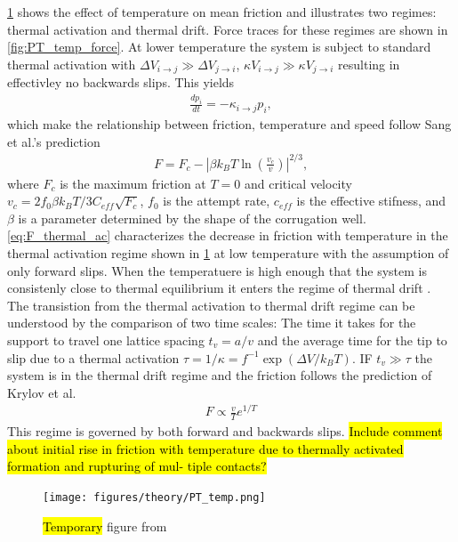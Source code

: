 \cref{fig:PT_temp} shows the effect of temperature on mean friction and illustrates two regimes: thermal activation and thermal drift. Force traces for these regimes are shown in \cref{fig:PT_temp_force}. At lower temperature the system is subject to standard thermal activation with $\Delta V_{i \to j} \gg \Delta V_{j \to i}$,   $\kappa V_{i \to j} \gg \kappa V_{j \to i}$ resulting in effectivley no backwards slips. This yields 
\begin{align*}
  \frac{dp_i}{dt} = -\kappa_{i\to j}p_i,
\end{align*}
which make the relationship between friction, temperature and speed follow Sang et al.’s prediction \cite{Sang_2001}
\begin{align}
  F=F_c-\left|\beta k_B T \ln \left(\frac{v_c}{v}\right)\right|^{2 / 3},
  \label{eq:F_thermal_ac}
\end{align}
where $F_c$ is the maximum friction at $T = 0$ and critical velocity $v_c = 2f_0
\beta k_B T / 3 C_{eff} \sqrt{F_c}$, $f_0$ is the attempt rate, $c_{eff}$ is the
effective stifness, and $\beta$ is a parameter determined by the shape of the
corrugation well. \cref{eq:F_thermal_ac} characterizes the decrease in friction
with temperature in the thermal activation regime shown in \cref{fig:PT_temp} at
low temperature with the assumption of only forward slips. When the temperatuere
is high enough that the system is consistenly close to thermal equilibrium it
enters the regime of thermal drift \cite{PhysRevE.71.065101}. The transistion
from the thermal activation to thermal drift regime can be understood by the
comparison of two time scales: The time it takes for the support to travel one
lattice spacing $t_v = a/v$ and the average time for the tip to slip due to a
thermal activation $\tau = 1/\kappa = f^{-1}\exp(\Delta V / k_BT)$. IF $t_v \gg
\tau$ the system is in the thermal drift regime and the friction follows the
prediction of Krylov et al. \cite{Krylow_2007, PhysRevE.71.065101, Jinesh_2008}
\begin{align*}
  F \propto \frac{v}{T}e^{1/T}
\end{align*}
This regime is governed by both forward and backwards slips. \hl{Include comment about initial rise in friction with temperature due to thermally activated formation and rupturing of mul- tiple contacts?}



  
\begin{figure}[H]
  \centering
  \texttt{[image: figures/theory/PT\_temp.png]}
  \caption{\hl{Temporary} figure from \cite{Yalin_2011}}
  \label{fig:PT_temp}
\end{figure}

